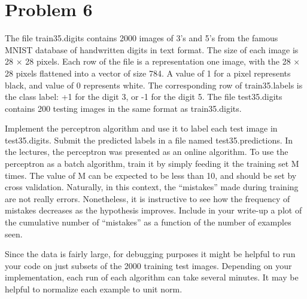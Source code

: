 \section{Problem 6}
The file train35.digits contains 2000 images of 3’s and 5’s from the famous MNIST database of handwritten digits in text format. The size of each image is 28 × 28 pixels. Each row of the file is a representation one image, with the 28 × 28 pixels flattened into a vector of size 784. A value of 1 for a pixel represents black, and value of 0 represents white. The corresponding row of train35.labels is the class label: +1 for the digit 3, or -1 for the digit 5. The file test35.digits contains 200 testing images in the same format as train35.digits. 

\jump
Implement the perceptron algorithm and use it to label each test image in test35.digits. Submit the predicted labels in a file named test35.predictions. In the lectures, the perceptron was presented as an online algorithm. To use the perceptron as a batch algorithm, train it by simply feeding it the training set M times. The value of M can be expected to be less than 10, and should be set by cross validation. Naturally, in this context, the “mistakes” made during training are not really errors. Nonetheless, it is instructive to see how the frequency of mistakes decreases as the hypothesis improves. Include in your write-up a plot of the cumulative number of “mistakes” as a function of the number of examples seen.

\jump
Since the data is fairly large, for debugging purposes it might be helpful to run your code on just subsets of the 2000 training test images. Depending on your implementation, each run of each algorithm can take several minutes. It may be helpful to normalize each example to unit norm.

